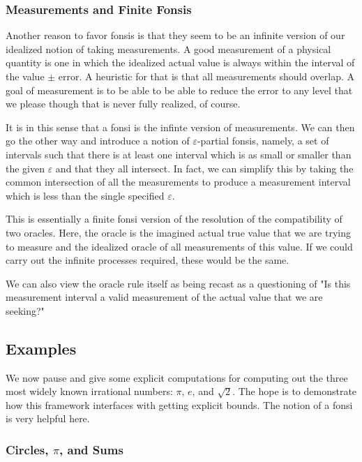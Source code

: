\documentclass[12pt]{article}
\begin{document}
\subsubsection{Measurements and Finite Fonsis}

Another reason to favor fonsis is that they seem to be an infinite version of our idealized notion of taking measurements. A good measurement of a physical quantity is one in which the idealized actual value is always within the interval of the value $\pm$ error. A heuristic for that is that all measurements should overlap. A goal of measurement is to be able to be able to reduce the error to any level that we please though that is never fully realized, of course. 

It is in this sense that a fonsi is the infinte version of measurements. We can then go the other way and introduce a notion of $\varepsilon$-partial fonsis, namely, a set of intervals such that there is at least one interval which is as small or smaller than the given $\varepsilon$ and that they all intersect. In fact, we can simplify this by taking the common intersection of all the measurements to produce a measurement interval which is less than the single specified $\varepsilon$. 

This is essentially a finite fonsi version of the resolution of the compatibility of two oracles. Here, the oracle is the imagined actual true value that we are trying to measure and the idealized oracle of all measurements of this value. If we could carry out the infinite processes required, these would be the same. 

We can also view the oracle rule itself as being recast as a questioning of "Is this measurement interval a valid measurement of the actual value that we are seeking?"

\subsection{Examples}


We now pause and give some explicit computations for computing out the three most widely known irrational numbers: $\pi$, $e$, and $\sqrt{2}$. The hope is to demonstrate how this framework interfaces with getting explicit bounds. The notion of a fonsi is very helpful here. 

\subsubsection{Circles, $\pi$, and Sums}
\end{document}
